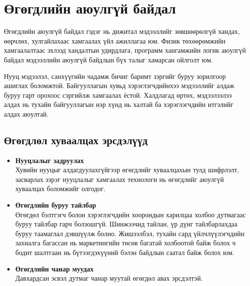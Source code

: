 \section{Өгөгдлийн аюулгүй байдал}
Өгөгдлийн аюулгүй байдал гэдэг нь дижитал мэдээллийг зөвшөөрөлгүй хандах, өөрчлөх, хулгайлахаас хамгаалах үйл ажиллагаа юм. Физик төхөөрөмжийн хамгаалалтаас эхлээд хандалтын удирдлага, программ хангамжийн логик аюулгүй байдал мэдээллийн аюулгүй байдлын бүх талыг хамарсан ойлголт юм. \cite{IBMSecureData}

Нууц мэдээлэл, санхүүгийн чадамж бичиг баримт зэргийг буруу зорилгоор ашиглах боломжтой.
Байгууллагын хувьд хэрэглэгчдийнхээ мэдээллийг алдаж буруу гарт орохоос сэргийлж хамгаалах ёстой. Халдлагад өртөх, мэдээлээлээ алдах нь тухайн байгууллагын нэр хүнд нь халтай ба хэрэглэгчдийн итгэлийг алдах аюултай.

\subsection*{Өгөгдлөл хуваалцах эрсдэлүүд}

\begin{itemize}
    \item \textbf{Нууцлалыг задруулах}\\
          Хувийн нууцыг алдагдуулахгүйгээр өгөгдлийг хуваалцахын тулд шифрлэлт, засварлах зэрэг нууцлалыг хамгаалах технологи нь өгөгдлийг аюулгүй хуваалцах боломжийг олгодог.
    \item \textbf{Өгөгдлийн буруу тайлбар}\\
          Өгөгдөл бэлтгэгч болон хэрэглэгчдийн хоорондын харилцаа холбоо дутмагаас буруу тайлбар гарч болзошгүй. Шинжээчид тайлан, үр дүнг тайлбарлахдаа буруу таамаглал дэвшүүлж болно. Жишээлбэл, тухайн сард үйлчлүүлэгчдийн захиалга багассан нь маркетингийн төсөв багатай холбоотой байж болох ч бодит шалтгаан нь бүтээгдэхүүний бэлэн байдлын саатал байж болох юм.
    \item \textbf{Өгөгдлийн чанар муудах}\\
          Давхардсан эсвэл дутмаг чанар муутай өгөгдөл авах эрсдэлтэй.
\end{itemize}

